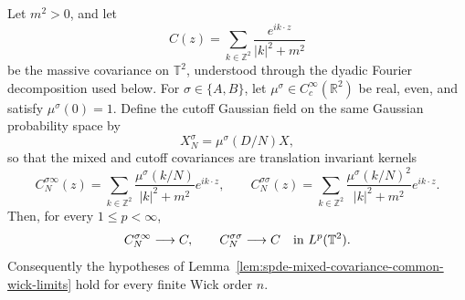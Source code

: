 \begin{proposition}
\label{prop:spde-smooth-fourier-multiplier-covariance-convergence}
Let \(m^2>0\), and let
\[
  C(z)=\sum_{k\in\mathbb Z^2}\frac{e^{ik\cdot z}}{|k|^2+m^2}
\]
be the massive covariance on \(\mathbb T^2\), understood through the
dyadic Fourier decomposition used below.  For
\(\sigma\in\{A,B\}\), let \(\mu^\sigma\in C_c^\infty(\mathbb R^2)\) be
real, even, and satisfy \(\mu^\sigma(0)=1\).  Define the cutoff Gaussian
field on the same Gaussian probability space by
\[
  X_N^\sigma=\mu^\sigma(D/N)X,
\]
so that the mixed and cutoff covariances are translation invariant kernels
\[
  C_N^{\sigma\infty}(z)
  =
  \sum_{k\in\mathbb Z^2}
  \frac{\mu^\sigma(k/N)}{|k|^2+m^2}e^{ik\cdot z},
  \qquad
  C_N^{\sigma\sigma}(z)
  =
  \sum_{k\in\mathbb Z^2}
  \frac{\mu^\sigma(k/N)^2}{|k|^2+m^2}e^{ik\cdot z}.
\]
Then, for every \(1\leq p<\infty\),
\begin{equation}
  C_N^{\sigma\infty}\longrightarrow C,
  \qquad
  C_N^{\sigma\sigma}\longrightarrow C
  \quad\hbox{in }L^p(\mathbb T^2).
  \label{eq:spde-smooth-fourier-multiplier-covariance-lp}
\end{equation}
Consequently the hypotheses of
Lemma~\ref{lem:spde-mixed-covariance-common-wick-limits} hold for
every finite Wick order \(n\).
\end{proposition}

